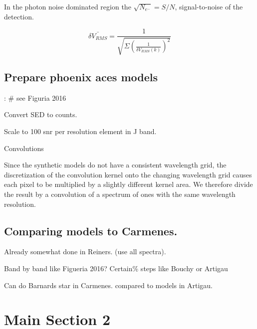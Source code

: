 In the photon noise dominated region the \(\sqrt{N_{e^-}} = S/N\), signal-to-noise of the detection.  


\begin{equation}
\bar{\delta V_{RMS}} = \frac{1}{\sqrt{\Sigma{(\frac{1}{\delta V_{RMS}(k)})^2}}}
\end{equation}



\subsection{Prepare phoenix aces models}:
\# see Figuria 2016

Convert SED to counts.


Scale to 100 snr per resolution element in J band.

Convolutions


Since the synthetic models do not have a consistent wavelength grid, the discretization of the convolution kernel onto the  changing wavelength grid causes each pixel to be multiplied by  a slightly different kernel area. We therefore divide the result by a convolution of a spectrum of ones with the same wavelength resolution.



\subsection{Comparing models to Carmenes.}
Already somewhat done in Reiners. (use all spectra).

Band by band like Figueria 2016?
Certain\% steps like Bouchy or Artigau


Can do Barnards star in Carmenes. compared to models in Artigau.




\section{Main Section 2}
